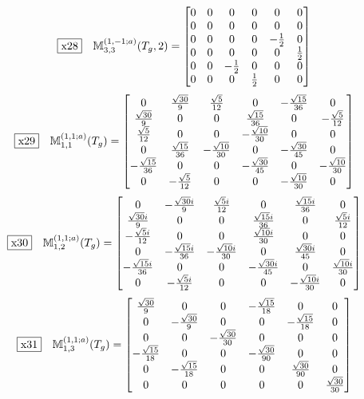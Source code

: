 \documentclass[fleqn,10pt,landscape]{jsarticle}
\begin{document}
\begin{dmath*}
\fbox{x28}\quad \mathbb{M}_{3,3}^{(1,-1;a)}(T_{g},2)=\begin{bmatrix} 0 & 0 & 0 & 0 & 0 & 0 \\ 0 & 0 & 0 & 0 & 0 & 0 \\ 0 & 0 & 0 & 0 & - \frac{1}{2} & 0 \\ 0 & 0 & 0 & 0 & 0 & \frac{1}{2} \\ 0 & 0 & - \frac{1}{2} & 0 & 0 & 0 \\ 0 & 0 & 0 & \frac{1}{2} & 0 & 0 \end{bmatrix}
\end{dmath*}
\begin{dmath*}
\fbox{x29}\quad \mathbb{M}_{1,1}^{(1,1;a)}(T_{g})=\begin{bmatrix} 0 & \frac{\sqrt{30}}{9} & \frac{\sqrt{5}}{12} & 0 & - \frac{\sqrt{15}}{36} & 0 \\ \frac{\sqrt{30}}{9} & 0 & 0 & \frac{\sqrt{15}}{36} & 0 & - \frac{\sqrt{5}}{12} \\ \frac{\sqrt{5}}{12} & 0 & 0 & - \frac{\sqrt{10}}{30} & 0 & 0 \\ 0 & \frac{\sqrt{15}}{36} & - \frac{\sqrt{10}}{30} & 0 & - \frac{\sqrt{30}}{45} & 0 \\ - \frac{\sqrt{15}}{36} & 0 & 0 & - \frac{\sqrt{30}}{45} & 0 & - \frac{\sqrt{10}}{30} \\ 0 & - \frac{\sqrt{5}}{12} & 0 & 0 & - \frac{\sqrt{10}}{30} & 0 \end{bmatrix}
\end{dmath*}
\begin{dmath*}
\fbox{x30}\quad \mathbb{M}_{1,2}^{(1,1;a)}(T_{g})=\begin{bmatrix} 0 & - \frac{\sqrt{30} i}{9} & \frac{\sqrt{5} i}{12} & 0 & \frac{\sqrt{15} i}{36} & 0 \\ \frac{\sqrt{30} i}{9} & 0 & 0 & \frac{\sqrt{15} i}{36} & 0 & \frac{\sqrt{5} i}{12} \\ - \frac{\sqrt{5} i}{12} & 0 & 0 & \frac{\sqrt{10} i}{30} & 0 & 0 \\ 0 & - \frac{\sqrt{15} i}{36} & - \frac{\sqrt{10} i}{30} & 0 & \frac{\sqrt{30} i}{45} & 0 \\ - \frac{\sqrt{15} i}{36} & 0 & 0 & - \frac{\sqrt{30} i}{45} & 0 & \frac{\sqrt{10} i}{30} \\ 0 & - \frac{\sqrt{5} i}{12} & 0 & 0 & - \frac{\sqrt{10} i}{30} & 0 \end{bmatrix}
\end{dmath*}
\begin{dmath*}
\fbox{x31}\quad \mathbb{M}_{1,3}^{(1,1;a)}(T_{g})=\begin{bmatrix} \frac{\sqrt{30}}{9} & 0 & 0 & - \frac{\sqrt{15}}{18} & 0 & 0 \\ 0 & - \frac{\sqrt{30}}{9} & 0 & 0 & - \frac{\sqrt{15}}{18} & 0 \\ 0 & 0 & - \frac{\sqrt{30}}{30} & 0 & 0 & 0 \\ - \frac{\sqrt{15}}{18} & 0 & 0 & - \frac{\sqrt{30}}{90} & 0 & 0 \\ 0 & - \frac{\sqrt{15}}{18} & 0 & 0 & \frac{\sqrt{30}}{90} & 0 \\ 0 & 0 & 0 & 0 & 0 & \frac{\sqrt{30}}{30} \end{bmatrix}
\end{dmath*}
\end{document}
